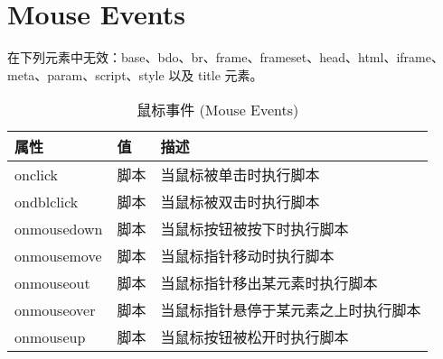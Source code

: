\chapter{Mouse Events}

在下列元素中无效：base、bdo、br、frame、frameset、head、html、iframe、meta、param、script、style 以及 title 元素。

\begin{table}[!h]
\centering
\caption{鼠标事件 (Mouse Events)}
\begin{tabular}{|l|l|l|}
\hline
属性			&值		&描述\\
\hline
onclick		&脚本	&当鼠标被单击时执行脚本\\
\hline
ondblclick	&脚本	&当鼠标被双击时执行脚本\\
\hline
onmousedown	&脚本	&当鼠标按钮被按下时执行脚本\\
\hline
onmousemove	&脚本	&当鼠标指针移动时执行脚本\\
\hline
onmouseout	&脚本	&当鼠标指针移出某元素时执行脚本\\
\hline
onmouseover	&脚本	&当鼠标指针悬停于某元素之上时执行脚本\\
\hline
onmouseup	&脚本	&当鼠标按钮被松开时执行脚本\\
\hline
\end{tabular}
\end{table}

















